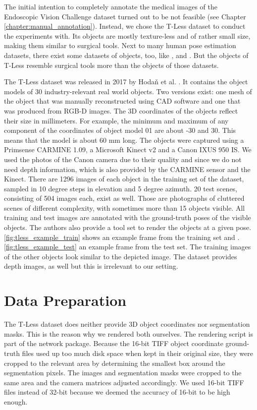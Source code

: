 The initial intention to completely annotate the medical images of the Endoscopic Vision Challenge dataset turned out to be not feasible (see Chapter \ref{chapter:manual_annotation}). Instead, we chose the T-Less dataset to conduct the experiments with. Its objects are mostly texture-less  and of rather small size, making them similar to surgical tools. Next to many human pose estimation datasets, there exist some datasets of objects, too, like \cite{next_view_dataset}, \cite{pracsys_dataset} and \cite{rigid_body_dataset}. But the objects of T-Less resemble surgical tools more than the objects of those datasets.

The T-Less dataset was released in 2017 by Hoda\v{n} et al. \cite{tless}. It contains the object models of 30 industry-relevant real world objects. Two versions exist: one mesh of the object that was manually reconstructed using CAD software and one that was produced from RGB-D images. The 3D coordinates of the objects reflect their size in millimeters. For example, the minimum and maximum of any component of the coordinates of object model 01 are about -30 and 30. This means that the model is about 60 mm long. The objects were captured using a Primsense CARMINE 1.09, a Microsoft Kinect v2 and a Canon IXUS 950 IS. We used the photos of the Canon camera due to their quality and since we do not need depth information, which is also provided by the CARMINE sensor and the Kinect. There are 1296 images of each object in the training set of the dataset, sampled in 10 degree steps in elevation and 5 degree azimuth. 20 test scenes, consisting of 504 images each, exist as well. Those are photographs of cluttered scenes of different complexity, with sometimes more than 15 objects visible. All training and test images are annotated with the ground-truth poses of the visible objects. The authors also provide a tool set to render the objects at a given pose. \fig \ref{fig:tless_example_train} shows an example frame from the training set and \fig. \ref{fig:tless_example_test} an example frame from the test set. The training images of the other objects look similar to the depicted image. The dataset provides depth images, as well but this is irrelevant to our setting.

\section{Data Preparation}

The T-Less dataset does neither provide 3D object coordinates nor segmentation masks. This is the reason why we rendered both ourselves. The rendering script is part of the network package. Because the 16-bit TIFF object coordinate ground-truth files used up too much disk space when kept in their original size, they were cropped to the relevant area by determining the smallest box around the segmentation pixels. The images and segmentation masks were cropped to the same area and the camera matrices adjusted accordingly. We used 16-bit TIFF files instead of 32-bit because we deemed the accuracy of 16-bit to be high enough.


